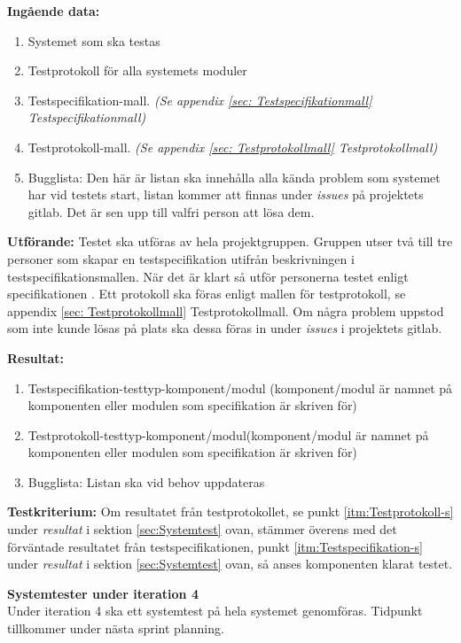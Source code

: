 \documentclass[a4paper,10pt, twoside]{article}
\begin{document}
\textbf{Ingående data:}
\begin{enumerate}
	\item Systemet som ska testas
    \item Testprotokoll för alla systemets moduler
    \item Testspecifikation-mall. \emph{(Se appendix \ref{sec: Testspecifikationmall} Testspecifikationmall)}
    \item Testprotokoll-mall. \emph{(Se appendix \ref{sec: Testprotokollmall} Testprotokollmall)}
    \item Bugglista: Den här är listan ska innehålla alla kända problem som systemet har vid testets start, listan kommer 
    att finnas under \emph{issues} på projektets gitlab. Det är sen upp till valfri person att lösa dem.
\end{enumerate}

\textbf{Utförande:} Testet ska utföras av hela projektgruppen. Gruppen utser två till tre personer som skapar en 
testspecifikation utifrån beskrivningen i testspecifikationsmallen. När det är klart så utför personerna testet enligt 
specifikationen \cite{kravspec}. Ett protokoll ska föras enligt mallen för testprotokoll, se appendix \ref{sec: 
Testprotokollmall} Testprotokollmall. Om några problem uppstod som inte kunde lösas på plats ska dessa föras in under 
\emph{issues} i projektets gitlab.

\textbf{Resultat:}
\begin{enumerate}
	\item \label{itm:Testspecifikation-s} Testspecifikation-testtyp-komponent/modul (komponent/modul är namnet på 
	komponenten eller modulen som specifikation är skriven för)
    \item \label{itm:Testprotokoll-s} Testprotokoll-testtyp-komponent/modul(komponent/modul är namnet på komponenten 	
    eller modulen som specifikation är skriven för)
    \item Bugglista: Listan ska vid behov uppdateras
\end{enumerate}

\textbf{Testkriterium:} Om resultatet från testprotokollet, se punkt \ref{itm:Testprotokoll-s} under \emph{resultat} i 
sektion \ref{sec:Systemtest} ovan, stämmer överens med det förväntade resultatet från testspecifikationen, punkt 
\ref{itm:Testspecifikation-s} under \emph{resultat} i sektion \ref{sec:Systemtest} ovan, så anses komponenten klarat 
testet.

\textbf{Systemtester under iteration 4}
\\ Under iteration 4 ska ett systemtest på hela systemet genomföras. Tidpunkt tillkommer under nästa sprint planning.
\end{document}
